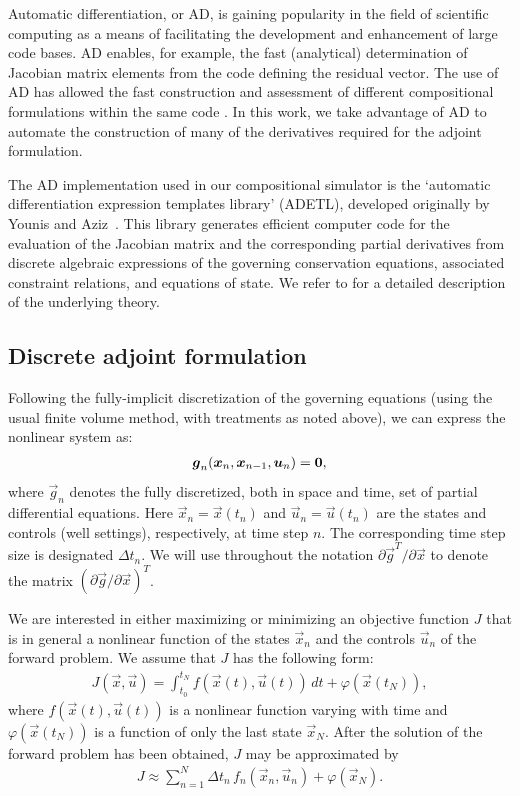 \documentclass[twocolumn,numbook]{svjour3}          %
\newcommand{\integral}[1]{\int_{t_0}^{t_N} {#1} \, dt}
\newcommand{\fsum}[3]{\sum_{#1}^{#2}{#3}}
\def\u{{\vec u}}
\def\x{{\vec x}}
\def\p{{\vec{g}}}
\def\0{{\vec 0}}
\def\M{{\varphi}}
\def\F{f}
\def\myobj{J}
\begin{document}
Automatic differentiation, or AD, is gaining popularity in the field of
scientific computing as a means of facilitating the development and enhancement of large code bases. AD enables, for example, the fast (analytical) determination of Jacobian matrix elements from the code
defining the residual vector. The use of AD has allowed the fast construction
and assessment of different compositional formulations within the same code
\cite{Voskov_nonlinear:2009}. In this work, we take advantage of AD to automate
the construction of many of the derivatives required for the adjoint
formulation.


The AD implementation used in our compositional simulator is the `automatic
differentiation expression templates library' (ADETL), developed originally by
Younis and Aziz~\cite{Younis:2007}.  This library generates efficient computer
code for the evaluation of the Jacobian matrix and the corresponding partial
derivatives from discrete algebraic expressions of the governing conservation
equations, associated constraint relations, and equations of state. We refer to
\cite{Younis:2007} for a detailed description of the underlying theory.


\subsection{Discrete adjoint formulation} \label{section:discreteAdjoint}

Following the fully-implicit discretization of the governing equations (using the usual finite volume method, with treatments as noted above), we can express the nonlinear system as:
%
\begin{align}
\label{eq:DiscretizedEquations}
\p_n(\x_n, \x_{n-1}, \u_n) =  \0 \rm,
\end{align}
%
where $\p_n$ denotes the fully discretized, both in space and time,
set of partial differential equations. Here $\x_n = \x(t_n)$ and $\u_n =
\u(t_n)$ are the states and controls (well settings), respectively, at time step $n$. The corresponding time step size
is designated $\Delta t_n$. We will use throughout the notation $\partial \p^T / \partial \x$ to denote the matrix $(\partial \p / \partial \x)^T$.



We are interested in either maximizing or minimizing
an objective function $\myobj$ that is in general a nonlinear function of the
states $\x_n$ and the controls $\u_n$ of the forward problem. We
assume that $\myobj$ has the following form:
%
\begin{align}
  \label{eq:continuousObjective}
  \myobj(\x, \u) = \integral{\F\left ( \x(t), \u(t) \right )} + \M(\x(t_N)),
\end{align}
%
where $\F(\x(t), \u(t))$ is a nonlinear function varying with time and $\M(\x(t_N))$ is a
function of only the last state $\x_N$. After the solution of the
forward problem has been obtained, $\myobj$ may be approximated by
%
\begin{align}
  \label{eq:discretizedObjective}
  \myobj \approx \fsum{n=1}{N}{ \Delta t_n \, \F_n \left ( \x_n, \u_n \right ) + \M(\x_N) }.
\end{align}
%
\end{document}

